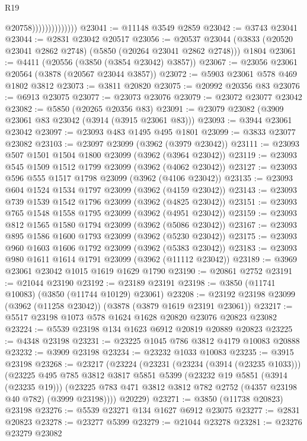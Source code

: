 \begin{lexlean}{R19}
\begin{coremodule}
                                @20758))))))))))))))
@23041 := @11148 @3549 @2859
@23042 := @3743 @23041
@23044 := @2831 @23042 @20517
@23056 := @20537
    @23044
    (@3833 (@20520 @23041 @2862 @2748) (@5850 (@20264 @23041 @2862 @2748)))
    @1804
@23061 := @4411 (@20556 (@3850 (@3854 @23042) @3857))
@23067 := @23056 @23061 @20564 (@3878 (@20567 @23044 @3857))
@23072 := @5903 @23061 @578 @469 @1802 @3812
@23073 := @3811 @20820
@23075 := @20992 @20356 @83
@23076 := @6913 @23075
@23077 := @23073 @23076
@23079 := @23072 @23077 @23042
@23082 := @5850 (@20265 @20356 @83)
@23091 := @23079 @23082 (@3909 @23061 @83 @23042 (@3914 (@3915 @23061 @83)))
@23093 := @3944 @23061 @23042
@23097 := @23093 @483 @1495 @495 @1801
@23099 := @3833 @23077 @23082
@23103 := @23097 @23099 (@3962 (@3979 @23042))
@23111 := @23093 @507 @1501 @1504 @1800 @23099 (@3962 (@3964 @23042))
@23119 := @23093 @545 @1509 @1512 @1799 @23099 (@3962 (@4062 @23042))
@23127 := @23093 @596 @555 @1517 @1798 @23099 (@3962 (@4106 @23042))
@23135 := @23093 @604 @1524 @1534 @1797 @23099 (@3962 (@4159 @23042))
@23143 := @23093 @739 @1539 @1542 @1796 @23099 (@3962 (@4825 @23042))
@23151 := @23093 @765 @1548 @1558 @1795 @23099 (@3962 (@4951 @23042))
@23159 := @23093 @812 @1565 @1580 @1794 @23099 (@3962 (@5086 @23042))
@23167 := @23093 @895 @1586 @1600 @1793 @23099 (@3962 (@5230 @23042))
@23175 := @23093 @960 @1603 @1606 @1792 @23099 (@3962 (@5383 @23042))
@23183 := @23093 @980 @1611 @1614 @1791 @23099 (@3962 (@11112 @23042))
@23189 := @3969 @23061 @23042 @1015 @1619 @1629 @1790
@23190 := @20861 @2752
@23191 := @21044 @23190
@23192 := @23189 @23191
@23198 := @3850 (@11741 @10083) (@3850 (@11744 @10129) @23061)
@23208 := @23192 @23198 @23099 (@3962 (@11258 @23042)) (@3878 (@3879 @1619 @23191 @23061))
@23217 := @5517 @23198 @1073 @578 @1624 @1628 @20820 @23076 @20823 @23082
@23224 := @5539 @23198 @134 @1623 @6912 @20819 @20889 @20823
@23225 := @4348 @23198
@23231 := @23225 @1045 @786 @3812 @4179 @10083 @20888
@23232 := @3909 @23198
@23234 := @23232 @1033 @10083
@23235 := @3915 @23198
@23268 := @23217
    (@23224
      (@23231
        (@23234 (@3914 (@23235 @1033)))
        (@23225
          @495
          @785
          @3812
          @3817
          @5851
          @5399
          (@23232 @19 @5851 (@3914 (@23235 @19)))
          (@23225 @783 @471 @3812 @3812 @782 @2752 (@4357 @23198 @40 @782) (@3999 @23198))))
      @20229)
@23271 := @3850 (@11738 @20823) @23198
@23276 := @5539 @23271 @134 @1627 @6912 @23075
@23277 := @2831 @20823
@23278 := @23277 @5399
@23279 := @21044 @23278
@23281 := @23276 @23279 @23082

\end{coremodule}
\end{lexlean}
